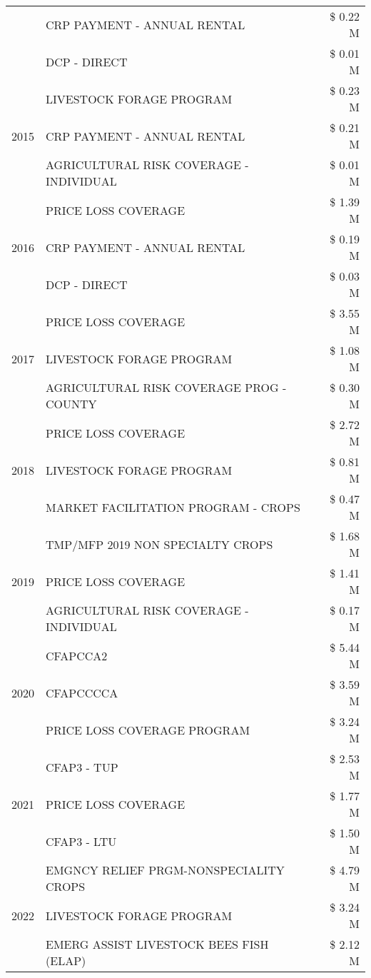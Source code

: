 \begin{tabular}{llr}
 & CRP PAYMENT - ANNUAL RENTAL & \$ 0.22 M \\
 & DCP - DIRECT & \$ 0.01 M \\
\cline{1-3}
\multirow[t]{3}{*}{2015} & LIVESTOCK FORAGE PROGRAM & \$ 0.23 M \\
 & CRP PAYMENT - ANNUAL RENTAL & \$ 0.21 M \\
 & AGRICULTURAL RISK COVERAGE - INDIVIDUAL & \$ 0.01 M \\
\cline{1-3}
\multirow[t]{3}{*}{2016} & PRICE LOSS COVERAGE & \$ 1.39 M \\
 & CRP PAYMENT - ANNUAL RENTAL & \$ 0.19 M \\
 & DCP - DIRECT & \$ 0.03 M \\
\cline{1-3}
\multirow[t]{3}{*}{2017} & PRICE LOSS COVERAGE & \$ 3.55 M \\
 & LIVESTOCK FORAGE PROGRAM & \$ 1.08 M \\
 & AGRICULTURAL RISK COVERAGE PROG - COUNTY & \$ 0.30 M \\
\cline{1-3}
\multirow[t]{3}{*}{2018} & PRICE LOSS COVERAGE & \$ 2.72 M \\
 & LIVESTOCK FORAGE PROGRAM & \$ 0.81 M \\
 & MARKET FACILITATION PROGRAM - CROPS & \$ 0.47 M \\
\cline{1-3}
\multirow[t]{3}{*}{2019} & TMP/MFP 2019 NON SPECIALTY CROPS & \$ 1.68 M \\
 & PRICE LOSS COVERAGE & \$ 1.41 M \\
 & AGRICULTURAL RISK COVERAGE - INDIVIDUAL & \$ 0.17 M \\
\cline{1-3}
\multirow[t]{3}{*}{2020} & CFAPCCA2 & \$ 5.44 M \\
 & CFAPCCCCA & \$ 3.59 M \\
 & PRICE LOSS COVERAGE PROGRAM & \$ 3.24 M \\
\cline{1-3}
\multirow[t]{3}{*}{2021} & CFAP3 - TUP & \$ 2.53 M \\
 & PRICE LOSS COVERAGE & \$ 1.77 M \\
 & CFAP3 - LTU & \$ 1.50 M \\
\cline{1-3}
\multirow[t]{3}{*}{2022} & EMGNCY RELIEF PRGM-NONSPECIALITY CROPS & \$ 4.79 M \\
 & LIVESTOCK FORAGE PROGRAM & \$ 3.24 M \\
 & EMERG ASSIST LIVESTOCK BEES FISH (ELAP) & \$ 2.12 M \\
\cline{1-3}
\bottomrule
\end{tabular}
